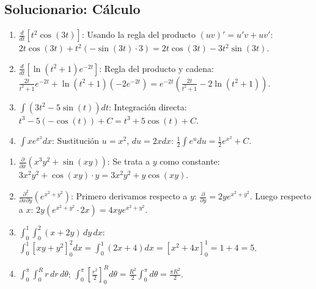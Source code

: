 \subsection{Solucionario: Cálculo}

\begin{sol}
\begin{enumerate}
    \item $\frac{d}{dt} [t^2 \cos(3t)]$: Usando la regla del producto $(uv)' = u'v + uv'$:
    $2t \cos(3t) + t^2 (-\sin(3t) \cdot 3) = 2t\cos(3t) - 3t^2\sin(3t)$.
    
    \item $\frac{d}{dt} [ \ln(t^2 + 1) e^{-2t} ]$: Regla del producto y cadena:
    $\frac{2t}{t^2+1} e^{-2t} + \ln(t^2+1) (-2e^{-2t}) = e^{-2t} \left( \frac{2t}{t^2+1} - 2\ln(t^2+1) \right)$.
    
    \item $\int (3t^2 - 5\sin(t)) dt$: Integración directa:
    $t^3 - 5(-\cos(t)) + C = t^3 + 5\cos(t) + C$.
    
    \item $\int x e^{x^2} dx$: Sustitución $u = x^2$, $du = 2x dx$:
    $\frac{1}{2} \int e^u du = \frac{1}{2} e^{x^2} + C$.
\end{enumerate}
\end{sol}

\begin{sol}
\begin{enumerate}
    \item $\frac{\partial}{\partial x}(x^3 y^2 + \sin(xy))$: Se trata a $y$ como constante:
    $3x^2 y^2 + \cos(xy) \cdot y = 3x^2 y^2 + y\cos(xy)$.
    
    \item $\frac{\partial^2}{\partial x \partial y} (e^{x^2+y^2})$: Primero derivamos respecto a $y$: $\frac{\partial}{\partial y} = 2y e^{x^2+y^2}$. Luego respecto a $x$: $2y (e^{x^2+y^2} \cdot 2x) = 4xy e^{x^2+y^2}$.
    
    \item $\int_0^1 \int_0^2 (x + 2y) \, dy \, dx$: 
    $\int_0^1 [xy + y^2]_0^2 dx = \int_0^1 (2x + 4) dx = [x^2 + 4x]_0^1 = 1 + 4 = 5$.
    
    \item $\int_0^\pi \int_0^R r \, dr \, d\theta$: 
    $\int_0^\pi [\frac{r^2}{2}]_0^R d\theta = \frac{R^2}{2} \int_0^\pi d\theta = \frac{\pi R^2}{2}$.
\end{enumerate}
\end{sol}


